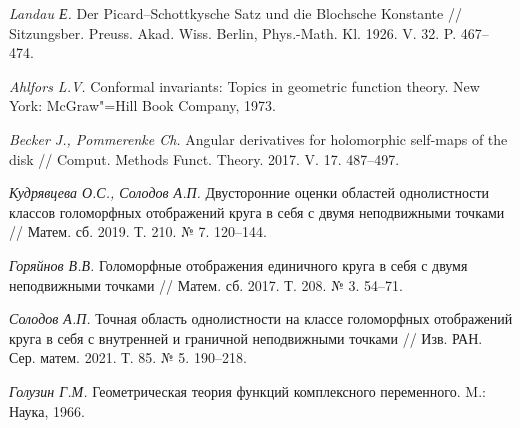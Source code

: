 \documentclass{article}
\theoremstyle{definition}
\theoremstyle{plain}
\begin{document}
\begin{thebibliography}{99}
\textit{Landau Е.}
Der Picard--Schottkysche Satz und die Blochsche Konstante //
Sitzungsber. Preuss. Akad. Wiss. Berlin, Phys.-Math. Kl. 1926. V. 32. P. 467--474.

\textit{Ahlfors L.V.}
Conformal invariants: Topics in geometric
	function theory. New York: McGraw"=Hill Book Company, 1973. 	

\textit{Becker J., Pommerenke Ch.}
Angular derivatives for holomorphic self-maps of the disk //
Comput. Methods Funct. Theory. 2017.
V. 17. 487--497.

\textit{Кудрявцева О.С., Солодов А.П.}
Двусторонние оценки областей однолистности классов голоморфных отображений круга в себя с двумя неподвижными точками //
Матем. сб. 2019. Т. 210. № 7. 120--144.

\textit{Горяйнов В.В.}
Голоморфные отображения единичного круга в себя с двумя неподвижными точками //
Матем. сб. 2017.
Т. 208. № 3. 54--71.

\textit{Солодов А.П.}
 Точная область однолистности на классе голоморфных отображений круга в себя с внутренней и граничной неподвижными точками //
Изв. РАН. Сер. матем. 2021. Т. 85. № 5. 190--218.

\textit{Голузин Г.М.}
Геометрическая теория функций комплексного переменного. M.:
Наука, 1966.

\end{thebibliography}
\end{document}
